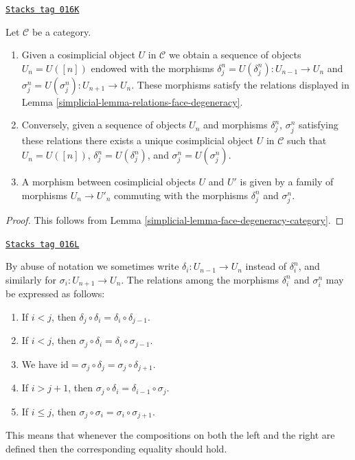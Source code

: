 \begin{lemma}
\label{simplicial-lemma-characterize-cosimplicial-object}
\href{https://stacks.math.columbia.edu/tag/016K}{\texttt{Stacks tag 016K}}

Let $\mathcal{C}$ be a category.
\begin{enumerate}
\item Given a cosimplicial object $U$ in $\mathcal{C}$
we obtain a sequence of objects $U_n = U([n])$ endowed
with the morphisms $\delta^n_j = U(\delta^n_j) : U_{n - 1} \to U_n$ and
$\sigma^n_j = U(\sigma^n_j) : U_{n + 1} \to U_n$. These morphisms
satisfy the relations displayed in
Lemma \ref{simplicial-lemma-relations-face-degeneracy}.
\item Conversely, given a sequence of objects $U_n$ and morphisms
$\delta^n_j$, $\sigma^n_j$ satisfying these relations there exists a unique
cosimplicial object $U$ in $\mathcal{C}$ such that $U_n = U([n])$,
$\delta^n_j = U(\delta^n_j)$, and $\sigma^n_j = U(\sigma^n_j)$.
\item A morphism between cosimplicial objects $U$ and $U'$
is given by a family of morphisms $U_n \to U'_n$ commuting
with the morphisms $\delta^n_j$ and $\sigma^n_j$.
\end{enumerate}
\end{lemma}

\begin{proof}

This follows from Lemma \ref{simplicial-lemma-face-degeneracy-category}.
\end{proof}

\begin{remark}
\label{simplicial-remark-relations-cosimplicial}
\href{https://stacks.math.columbia.edu/tag/016L}{\texttt{Stacks tag 016L}}

By abuse of notation we sometimes write $\delta_i : U_{n - 1} \to U_n$
instead of $\delta^n_i$, and similarly for $\sigma_i : U_{n + 1} \to U_n$.
The relations among the morphisms $\delta^n_i$ and $\sigma^n_i$
may be expressed as follows:
\begin{enumerate}
\item If $i < j$, then
$\delta_j \circ \delta_i = \delta_i \circ \delta_{j - 1}$.
\item If $i < j$, then
$\sigma_j \circ \delta_i = \delta_i \circ \sigma_{j - 1}$.
\item We have
$\text{id} = \sigma_j \circ \delta_j = \sigma_j \circ \delta_{j + 1}$.
\item If $i > j + 1$, then
$\sigma_j \circ \delta_i = \delta_{i - 1} \circ \sigma_j$.
\item If $i \leq j$, then
$\sigma_j \circ \sigma_i = \sigma_i \circ \sigma_{j + 1}$.
\end{enumerate}
This means that whenever the compositions on both the left and the
right are defined then the corresponding equality should hold.
\end{remark}

